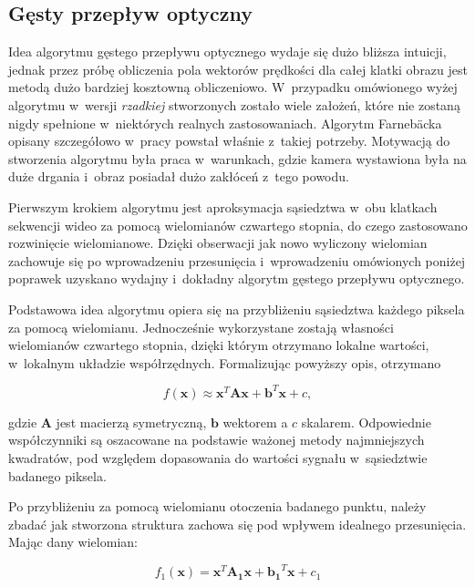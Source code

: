       \subsection{Gęsty przepływ optyczny}\label{Subsection_DenseOpticalFlow}
      Idea algorytmu gęstego przepływu optycznego wydaje się dużo bliższa intuicji, jednak przez próbę obliczenia pola wektorów prędkości dla całej klatki obrazu jest metodą dużo bardziej kosztowną obliczeniowo. W~przypadku omówionego wyżej algorytmu w~wersji \textit{rzadkiej} stworzonych zostało wiele założeń, które nie zostaną nigdy spełnione w~niektórych realnych zastosowaniach. Algorytm Farnebäcka opisany szczegółowo w~pracy \cite{GunnarFarneback03} powstał właśnie z~takiej potrzeby. Motywacją do stworzenia algorytmu była praca w~warunkach, gdzie kamera wystawiona była na duże drgania i~obraz posiadał dużo zakłóceń z~tego powodu.

      Pierwszym krokiem algorytmu jest aproksymacja sąsiedztwa w~obu klatkach sekwencji wideo za pomocą wielomianów czwartego stopnia, do czego zastosowano rozwinięcie wielomianowe. Dzięki obserwacji jak nowo wyliczony wielomian zachowuje się po wprowadzeniu przesunięcia i~wprowadzeniu omówionych poniżej poprawek uzyskano wydajny i~dokładny algorytm gęstego przepływu optycznego.

      Podstawowa idea algorytmu opiera się na przybliżeniu sąsiedztwa każdego piksela za pomocą wielomianu. Jednocześnie wykorzystane zostają własności wielomianów czwartego stopnia, dzięki którym otrzymano lokalne wartości, w~lokalnym układzie współrzędnych. Formalizując powyższy opis, otrzymano

        \begin{equation}
          f(\mathbf{x}) \approx \mathbf{x}^{T}\mathbf{A}\mathbf{x} + \mathbf{b}^{T}\mathbf{x} + c,
        \end{equation}

      gdzie $\mathbf{A}$ jest macierzą symetryczną, $\mathbf{b}$ wektorem a $c$ skalarem. Odpowiednie współczynniki są oszacowane na podstawie ważonej metody najmniejszych kwadratów, pod względem dopasowania do wartości sygnału w~sąsiedztwie badanego piksela.

      Po przybliżeniu za pomocą wielomianu otoczenia badanego punktu, należy zbadać jak stworzona struktura zachowa się pod wpływem idealnego przesunięcia. Mając dany wielomian:

        \begin{equation}
          f_{1}(\mathbf{x}) = \mathbf{x}^{T}\mathbf{A_{1}}\mathbf{x} + \mathbf{b_{1}}^{T}\mathbf{x} + c_{1}
        \end{equation}

